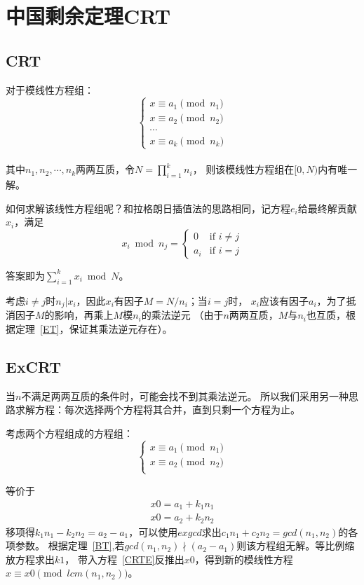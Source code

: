\section{中国剩余定理CRT}
\subsection{CRT}
\begin{theorem}
	对于模线性方程组：
	\begin{displaymath}
		\left\{\begin{array}{l}
			x \equiv a_1 \pmod{n_1} \\
			x \equiv a_2 \pmod{n_2} \\
			\cdots                  \\
			x \equiv a_k \pmod{n_k}
		\end{array}\right.
	\end{displaymath}\\
	其中$n_1,n_2,\cdots,n_k$两两互质，令$\displaystyle N=\prod_{i=1}^k{n_i}$，
	则该模线性方程组在$[0,N)$内有唯一解。
\end{theorem}

如何求解该线性方程组呢？和拉格朗日插值法的思路相同，记方程$e_i$给最终解贡献$x_i$，满足
\begin{displaymath}
	x_i \bmod n_j =
	\left\{\begin{array}{ll}
		0   & \textrm{if $i\neq j$} \\
		a_i & \textrm{if $i=j$}
	\end{array}\right.
\end{displaymath}

答案即为$\displaystyle \sum_{i=1}^k{x_i} \bmod N$。

考虑$i\neq j$时$n_j|x_i$，因此$x_i$有因子$M=N/n_i$；当$i=j$时，
$x_i$应该有因子$a_i$，为了抵消因子$M$的影响，再乘上$M$模$n_i$的乘法逆元
（由于$n$两两互质，$M$与$n_i$也互质，根据定理~\ref{ET}，保证其乘法逆元存在）。
\subsection{ExCRT}
当$n$不满足两两互质的条件时，可能会找不到其乘法逆元。
所以我们采用另一种思路求解方程：每次选择两个方程将其合并，直到只剩一个方程为止。

考虑两个方程组成的方程组：
\begin{displaymath}
	\left\{\begin{array}{l}
		x \equiv a_1 \pmod{n_1} \\
		x \equiv a_2 \pmod{n_2} \\
	\end{array}\right.
\end{displaymath}

等价于
\begin{eqnarray}
	x0=a_1+k_1n_1\label{CRTE}\\
	x0=a_2+k_2n_2
\end{eqnarray}
移项得$k_1n_1-k_2n_2=a_2-a_1$，可以使用$exgcd$求出$c_1n_1+c_2n_2=gcd(n_1,n_2)$的各项参数。
根据定理~\ref{BT},若$gcd(n_1,n_2)\nmid(a_2-a_1)$则该方程组无解。等比例缩放方程求出$k1$，
带入方程~\ref{CRTE}反推出$x0$，得到新的模线性方程$x \equiv x0\pmod{lcm(n_1,n_2)}$。
